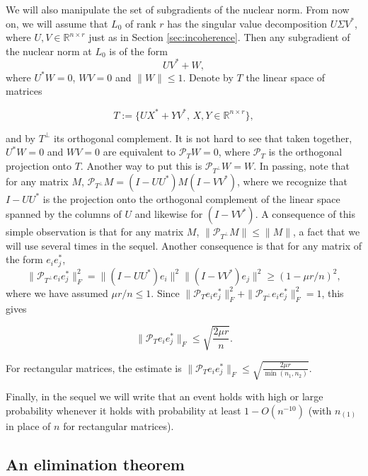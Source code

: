 We will also manipulate the set of subgradients of the nuclear norm. From now on, we will assume that $L_0$ of rank $r$ has the singular value decomposition $U\Sigma V^*$, where $U, V \in
\mathbb{R}^{n\times r}$ just as in Section \ref{sec:incoherence}. Then any subgradient of the nuclear norm at $L_0$ is of the form
\[
UV^* + W, 
\]
where $U^* W = 0$, $W V = 0$ and $\|W\| \le 1$. Denote by $T$ the linear space of matrices

\begin{equation}
  \label{eq:T}
  T := \{UX^* + YV^*, \, X, Y \in \mathbb{R}^{n \times r}\}, 
\end{equation}

and by $T^\perp$ its orthogonal complement. It is not hard to see that taken together, $U^* W = 0$ and $W V = 0$ are equivalent to $\mathcal{P}_T W = 0$, where $\mathcal{P}_T$ is the orthogonal projection onto $T$. Another way to put this is $\mathcal{P}_{T^\perp} W = W$. In passing, note that for any matrix $M$,
$\mathcal{P}_{T^\perp} M = (I - UU^*) M (I - VV^*)$, where we recognize that $I - UU^*$ is the projection onto the orthogonal complement of the linear space spanned by the columns of $U$ and likewise for $(I - VV^*)$. A consequence of this simple observation is that for any matrix $M$,
$\|\mathcal{P}_{T^\perp} M\| \le \|M\|$, a fact that we will use several times in the sequel. Another consequence is that for any matrix of the form $e_i e_j^*$, 
\[
\|\mathcal{P}_{T^\perp} e_i e_j^*\|_F^2 = \|(I - UU^*) e_i\|^2 \|(I - VV^*) e_j\|^2 \ge
(1-\mu r/n)^2,
\]
where we have assumed $\mu r/n \le 1$. Since $\|\mathcal{P}_T e_ie_j^*\|_F^2 +
\|\mathcal{P}_{T^\perp} e_i e_j^*\|_F^2 = 1$, this gives

\begin{equation}
  \label{eq:PTeiej}
  \|\mathcal{P}_T e_i e_j^*\|_F \le \sqrt{\frac{2\mu r}{n}}. 
\end{equation}

For rectangular matrices, the estimate is $ \|\mathcal{P}_T e_i e_j^*\|_F \le
\sqrt{\frac{2\mu r}{\min(n_1,n_2)}}$. 

Finally, in the sequel we will write that an event holds with high or large probability whenever it holds with probability at least $1 - O(n^{-10})$ (with $n_{(1)}$ in place of $n$ for rectangular matrices).

\subsection{An elimination theorem}
\label{sec:elimination}

